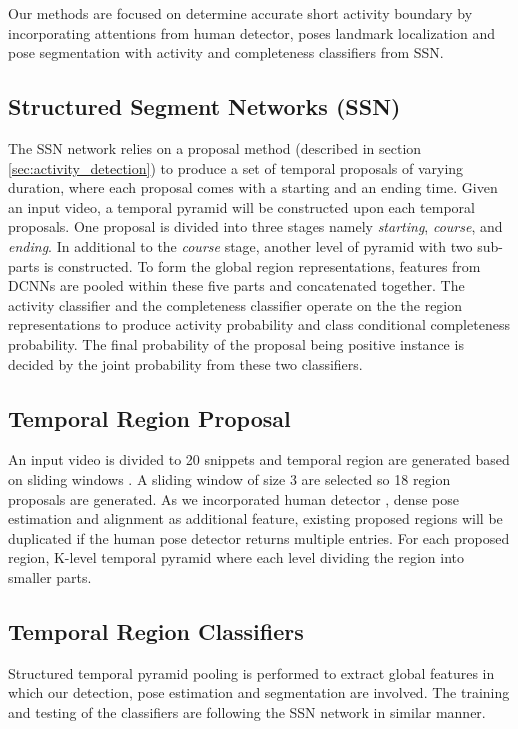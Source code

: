 Our methods are focused on determine accurate short activity boundary by incorporating attentions from human detector, poses landmark localization and pose segmentation with activity and completeness classifiers from SSN. 

\subsection{Structured Segment Networks (SSN)}
The SSN network \cite{zhao2017temporal} relies on a proposal method (described in section \ref{sec:activity_detection}) to produce a set of temporal proposals of varying duration, where each proposal comes with a starting and an ending time. Given an input video, a temporal pyramid will be constructed upon each temporal proposals. One proposal is divided into three stages namely \textit{starting}, \textit{course}, and \textit{ending}. In additional to the \textit{course} stage, another level of pyramid with two sub-parts is constructed. To form the global region representations, features from DCNNs are pooled within these five parts and concatenated together. The activity classifier and the completeness classifier operate on the the region representations to produce activity probability and class conditional completeness probability. The final probability of the proposal being positive instance is decided by the joint probability from these two classifiers.

\subsection{Temporal Region Proposal}
An input video is divided to 20 snippets and temporal region are generated based on sliding windows \cite{shou2016temporal, yuan2016temporal}. A sliding window of size 3 are selected so 18 region proposals are generated. As we incorporated human detector \cite{zeng2016crafting}, dense pose estimation and alignment as additional feature, existing proposed regions will be duplicated if the human pose detector returns multiple entries. For each proposed region,  K-level temporal pyramid where each level dividing the region into smaller parts.

\subsection{Temporal Region Classifiers}
Structured temporal pyramid pooling \cite{zhao2017temporal} is performed to extract global features in which our detection, pose estimation and segmentation are involved. The training and testing of the classifiers are following the SSN network in similar manner.

